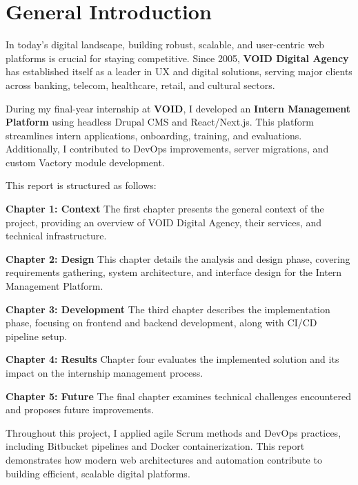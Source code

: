 \chapter*{General Introduction}
\thispagestyle{plain}

\indent In today's digital landscape, building robust, scalable, and user-centric web platforms is crucial for staying competitive. Since 2005, \textbf{VOID Digital Agency} has established itself as a leader in UX and digital solutions, serving major clients across banking, telecom, healthcare, retail, and cultural sectors.

\bigskip

\indent During my final-year internship at \textbf{VOID}, I developed an \textbf{Intern Management Platform} using headless Drupal CMS and React/Next.js. This platform streamlines intern applications, onboarding, training, and evaluations. Additionally, I contributed to DevOps improvements, server migrations, and custom Vactory module development.

\bigskip

\indent This report is structured as follows:

\medskip

\textbf{Chapter 1: Context}
The first chapter presents the general context of the project, providing an overview of VOID Digital Agency, their services, and technical infrastructure.

\textbf{Chapter 2: Design}
This chapter details the analysis and design phase, covering requirements gathering, system architecture, and interface design for the Intern Management Platform.

\textbf{Chapter 3: Development}
The third chapter describes the implementation phase, focusing on frontend and backend development, along with CI/CD pipeline setup.

\textbf{Chapter 4: Results}
Chapter four evaluates the implemented solution and its impact on the internship management process.

\textbf{Chapter 5: Future}
The final chapter examines technical challenges encountered and proposes future improvements.

\bigskip

\indent Throughout this project, I applied agile Scrum methods and DevOps practices, including Bitbucket pipelines and Docker containerization. This report demonstrates how modern web architectures and automation contribute to building efficient, scalable digital platforms.

\clearpage
